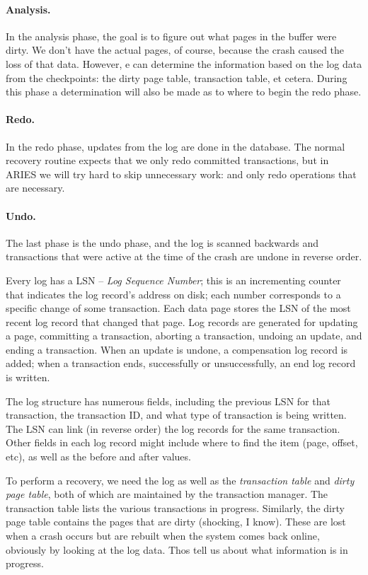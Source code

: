 \paragraph{Analysis.} In the analysis phase, the goal is to figure out what pages in the buffer were dirty. We don't have the actual pages, of course, because the crash caused the loss of that data. However, e can determine the information based on the log data from the checkpoints: the dirty page table, transaction table, et cetera. During this phase a determination will also be made as to where to begin the redo phase.

\paragraph{Redo.} In the redo phase, updates from the log are done in the database. The normal recovery routine expects that we only redo committed transactions, but in ARIES we will try hard to skip unnecessary work: and only redo operations that are necessary.

\paragraph{Undo.} The last phase is the undo phase, and the log is scanned backwards and transactions that were active at the time of the crash are undone in reverse order. 

Every log has a LSN -- \textit{Log Sequence Number}; this is an incrementing counter that indicates the log record's address on disk; each number corresponds to a specific change of some transaction. Each data page stores the LSN of the most recent log record that changed that page. Log records are generated for updating a page, committing a transaction, aborting a transaction, undoing an update, and ending a transaction.  When an update is undone, a compensation log record is added; when a transaction ends, successfully or unsuccessfully, an end log record is written. 

The log structure has numerous fields, including the previous LSN for that transaction, the transaction ID, and what type of transaction is being written. The LSN can link (in reverse order) the log records for the same transaction. Other fields in each log record might include where to find the item (page, offset, etc), as well as the before and after values.

To perform a recovery, we need the log as well as the \textit{transaction table} and \textit{dirty page table}, both of which are maintained by the transaction manager. The transaction table lists the various transactions in progress. Similarly, the dirty page table contains the pages that are dirty (shocking, I know). These are lost when a crash occurs but are rebuilt when the system comes back online, obviously by looking at the log data. Thos tell us about what information is in progress.

